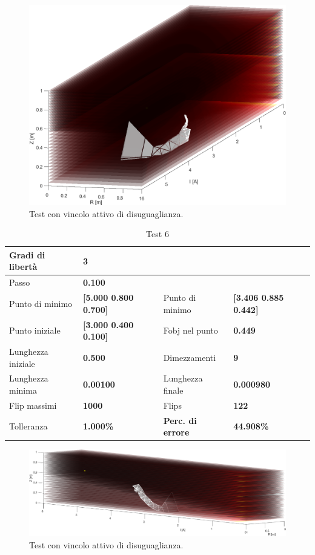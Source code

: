 \documentclass[a4paper, 11pt]{article}
\begin{document}
\begin{figure}[H]
	\centering
		\includegraphics[width=14cm]{assets/figure7}
		\caption{Test con vincolo attivo di disuguaglianza.}
\end{figure}
\noindent

\begin{table}[h]
	\caption{Test 6}
	\begin{center}
	\begin{tabular}{|l|l|l|l|} 
	\hline 
	Gradi di libertà & \textbf{3} &  &  \\ \hline 
	Passo & \textbf{0.100} &  &  \\ \hline 
	Punto di minimo & \textbf{{[}5.000 0.800 0.700{]}} & Punto di minimo & \textbf{{[}3.406 0.885 0.442{]}} \\ \hline 
	Punto iniziale & \textbf{{[}3.000 0.400 0.100{]}} & Fobj nel punto & \textbf{0.449} \\ \hline 
	Lunghezza iniziale & \textbf{0.500} & Dimezzamenti & \textbf{9} \\ \hline 
	Lunghezza minima & \textbf{0.00100} & Lunghezza finale & \textbf{0.000980} \\ \hline
	Flip massimi & \textbf{1000} & Flips & \textbf{122} \\ \hline 
	Tolleranza & \textbf{1.000\%} & \textbf{Perc. di errore} & \textbf{44.908\%} \\ \hline 
	\end{tabular}
	\end{center}
	\end{table}

\begin{figure}[H]
	\centering
		\includegraphics[width=16cm]{assets/figure8}
		\caption{Test con vincolo attivo di disuguaglianza.}
\end{figure}
\noindent
\end{document}
